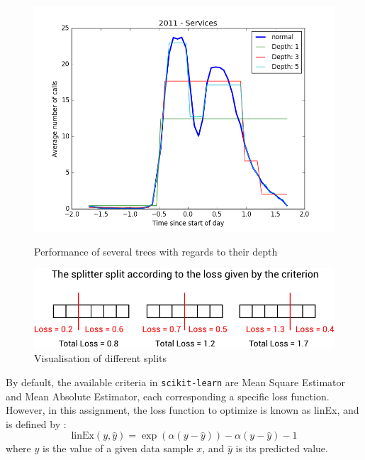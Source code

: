 \documentclass[a4paper,10pt]{article}
\begin{document}
  \begin{figure}[h]
    \begin{minipage}{0.48\textwidth}
      \centering
      \includegraphics[width=\textwidth]{graphics/1-TreeRegression.png}
      \caption{Performance of several trees with regards to their depth}
      \label{treePerf}
    \end{minipage}
    \hfill
    \begin{minipage}{0.48\textwidth}
      \centering
      \includegraphics[width=\textwidth]{graphics/splitterpng.png}
      \caption{Visualisation of different splits}
      \label{splitting}
    \end{minipage}
  \end{figure}
  By default, the available criteria in {\tt scikit-learn} are Mean Square Estimator and Mean Absolute Estimator, each corresponding a specific loss function. However, in this assignment, the loss function to optimize is known as linEx, and is defined by :
  \begin{equation}
    \text{linEx}(y,\hat{y}) = \exp \left( \alpha (y-\hat{y})\right) - \alpha (y-\hat{y}) -1
  \end{equation}
  where $y$ is the value of a given data sample $x$, and $\hat{y}$ is its predicted value.
\end{document}
